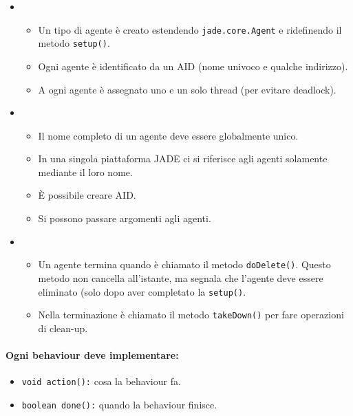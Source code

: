 \begin{itemize}
  \item {}
    \begin{itemize}
      \item Un tipo di agente è creato estendendo \texttt{jade.core.Agent} e ridefinendo il metodo \texttt{setup()}. 
      \item Ogni agente è identificato da un AID (nome univoco e qualche indirizzo).
      \item A ogni agente è assegnato uno e un solo thread (per evitare deadlock).
    \end{itemize}
  \item {}
    \begin{itemize}
      \item Il nome completo di un agente deve essere globalmente unico. 
      \item In una singola piattaforma JADE ci si riferisce agli agenti solamente mediante il loro nome. 
      \item È possibile creare AID. 
      \item Si possono passare argomenti agli agenti.
    \end{itemize}
  \item {}
    \begin{itemize}
      \item Un agente termina quando è chiamato il metodo \texttt{doDelete()}. Questo metodo non cancella all'istante, ma segnala che l'agente deve essere eliminato (solo dopo aver completato la \texttt{setup()}. 
      \item Nella terminazione è chiamato il metodo \texttt{takeDown()} per fare operazioni di clean-up.
    \end{itemize}
\end{itemize}


\paragraph{Ogni behaviour deve implementare:}

\begin{itemize}
  \item \texttt{void action():} cosa la behaviour fa. 
  \item \texttt{boolean done():} quando la behaviour finisce.
\end{itemize}

